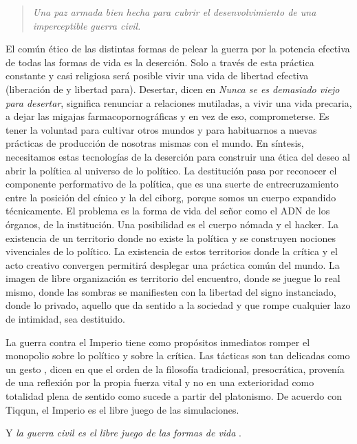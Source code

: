 \begin{quote}
  \emph{Una paz armada bien hecha para cubrir el desenvolvimiento de una imperceptible guerra civil.} \autocite{tiqqunComoHacer}
\end{quote}

El común ético de las distintas formas de pelear la guerra por la potencia efectiva de todas las formas de vida es la deserción. Solo a través de esta práctica constante y casi religiosa será posible vivir una vida de libertad efectiva (liberación de y libertad para). Desertar, dicen en \emph{Nunca se es demasiado viejo para desertar}, significa renunciar a relaciones mutiladas, a vivir una vida precaria, a dejar las migajas farmacopornográficas y en vez de eso, comprometerse. Es tener la voluntad para cultivar otros mundos y para habituarnos a nuevas prácticas de producción de nosotras mismas con el mundo. En síntesis, necesitamos estas tecnologías de la deserción para construir una ética del deseo al abrir la política al universo de lo político. La destitución pasa por reconocer el componente performativo de la política, que es una suerte de entrecruzamiento entre la posición del cínico y la del ciborg, porque somos un cuerpo expandido técnicamente. El problema es la forma de vida del señor como el ADN de los órganos, de la institución. Una posibilidad es el cuerpo nómada y el hacker. La existencia de un territorio donde no existe la política y se construyen nociones vivenciales de lo político. La existencia de estos territorios donde la crítica y el acto creativo convergen permitirá desplegar una práctica común del mundo. La imagen de libre organización es territorio del encuentro, donde se juegue lo real mismo, donde las sombras se manifiesten con la libertad del signo instanciado, donde lo privado, aquello que da sentido a la sociedad y que rompe cualquier lazo de intimidad, sea destituido.

La guerra contra el Imperio tiene como propósitos inmediatos romper el monopolio sobre lo político y sobre la crítica. Las tácticas son tan delicadas como un gesto \autocite{comiteinvisibleAhora2017}, dicen en \autocite{anonimoQuinismoImposibleAcerca2010} que el orden de la filosofía tradicional, presocrática, provenía de una reflexión por la propia fuerza vital y no en una exterioridad como totalidad plena de sentido como sucede a partir del platonismo. De acuerdo con Tiqqun, el Imperio es el libre juego de las simulaciones.

Y \emph{la guerra civil es el libre juego de las formas de vida} \autocite{tiqqunIntroduccionGuerraCivil2008}.

